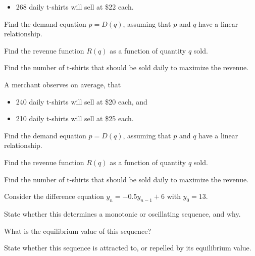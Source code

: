 \documentclass[12pt,legalpaper]{exam}
\newcommand{\vsp}{\vspace{0.5cm}}
\newcommand{\smsp}{\vspace{0.25cm}}
\begin{document}
\begin{questions}
\begin{itemize}
\item 268 daily t-shirts will sell at \$22 each.
\end{itemize}
\vsp

\begin{compactenum}[(a)]
\item Find the demand equation $p = D(q)$, assuming that $p$ and $q$ have a linear relationship.
\vspace{5cm}

\item Find the revenue function $R(q)$ as a function of quantity $q$ sold.
\vspace{8cm}

\item Find the number of t-shirts that should be sold daily to maximize the revenue.
\end{compactenum}
\newpage

\question[5] A merchant observes on average, that
\begin{itemize}
\item 240 daily t-shirts will sell at \$20 each, and
\smsp

\item 210 daily t-shirts will sell at \$25 each.
\end{itemize}
\vsp

\begin{compactenum}[(a)]
\item Find the demand equation $p = D(q)$, assuming that $p$ and $q$ have a linear relationship.
\vspace{5cm}

\item Find the revenue function $R(q)$ as a function of quantity $q$ sold.
\vspace{8cm}

\item Find the number of t-shirts that should be sold daily to maximize the revenue.
\end{compactenum}
\newpage

\question[5] Consider the difference equation $y_{n} = -0.5y_{n-1} + 6$ with $y_{0} = 13$.
\begin{compactenum}[(a)]
\item State whether this determines a monotonic or oscillating sequence, and why.
\vfill

\item What is the equilibrium value of this sequence?
\vfill

\item State whether this sequence is attracted to, or repelled by its equilibrium value.
\vfill


\end{compactenum}
\end{questions}
\end{document}
